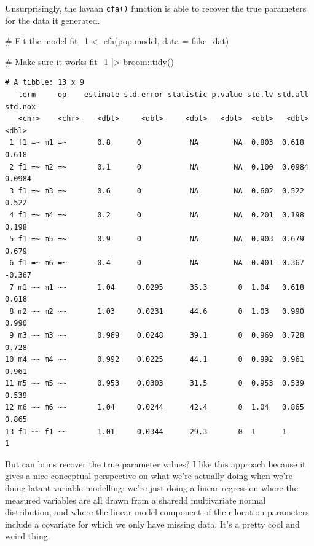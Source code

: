 \documentclass[
  letterpaper,
  DIV=11,
  numbers=noendperiod]{scrreprt}
\newenvironment{Shaded}{\begin{snugshade}}{\end{snugshade}}
\newcommand{\AttributeTok}[1]{\textcolor[rgb]{0.40,0.45,0.13}{#1}}
\newcommand{\CommentTok}[1]{\textcolor[rgb]{0.37,0.37,0.37}{#1}}
\newcommand{\FunctionTok}[1]{\textcolor[rgb]{0.28,0.35,0.67}{#1}}
\newcommand{\NormalTok}[1]{\textcolor[rgb]{0.00,0.23,0.31}{#1}}
\newcommand{\OtherTok}[1]{\textcolor[rgb]{0.00,0.23,0.31}{#1}}
\newcommand{\SpecialCharTok}[1]{\textcolor[rgb]{0.37,0.37,0.37}{#1}}
\begin{document}
Unsurprisingly, the lavaan \texttt{cfa()} function is able to recover
the true parameters for the data it generated.

\begin{Shaded}
\begin{Highlighting}[]
\CommentTok{\# Fit the model}
\NormalTok{fit\_1 }\OtherTok{\textless{}{-}} \FunctionTok{cfa}\NormalTok{(pop.model, }\AttributeTok{data =}\NormalTok{ fake\_dat)}

\CommentTok{\# Make sure it works}
\NormalTok{fit\_1 }\SpecialCharTok{|\textgreater{}}\NormalTok{ broom}\SpecialCharTok{::}\FunctionTok{tidy}\NormalTok{()}
\end{Highlighting}
\end{Shaded}

\begin{verbatim}
# A tibble: 13 x 9
   term     op    estimate std.error statistic p.value std.lv std.all std.nox
   <chr>    <chr>    <dbl>     <dbl>     <dbl>   <dbl>  <dbl>   <dbl>   <dbl>
 1 f1 =~ m1 =~       0.8      0           NA        NA  0.803  0.618   0.618 
 2 f1 =~ m2 =~       0.1      0           NA        NA  0.100  0.0984  0.0984
 3 f1 =~ m3 =~       0.6      0           NA        NA  0.602  0.522   0.522 
 4 f1 =~ m4 =~       0.2      0           NA        NA  0.201  0.198   0.198 
 5 f1 =~ m5 =~       0.9      0           NA        NA  0.903  0.679   0.679 
 6 f1 =~ m6 =~      -0.4      0           NA        NA -0.401 -0.367  -0.367 
 7 m1 ~~ m1 ~~       1.04     0.0295      35.3       0  1.04   0.618   0.618 
 8 m2 ~~ m2 ~~       1.03     0.0231      44.6       0  1.03   0.990   0.990 
 9 m3 ~~ m3 ~~       0.969    0.0248      39.1       0  0.969  0.728   0.728 
10 m4 ~~ m4 ~~       0.992    0.0225      44.1       0  0.992  0.961   0.961 
11 m5 ~~ m5 ~~       0.953    0.0303      31.5       0  0.953  0.539   0.539 
12 m6 ~~ m6 ~~       1.04     0.0244      42.4       0  1.04   0.865   0.865 
13 f1 ~~ f1 ~~       1.01     0.0344      29.3       0  1      1       1     
\end{verbatim}

But can brms recover the true parameter values? I like this approach
because it gives a nice conceptual perspective on what we're actually
doing when we're doing latant variable modelling: we're just doing a
linear regression where the measured variables are all drawn from a
sharedd multivariate normal distribution, and where the linear model
component of their location parameters include a covariate for which we
only have missing data. It's a pretty cool and weird thing.
\end{document}
